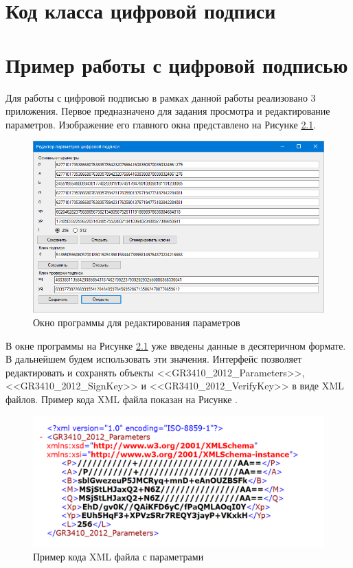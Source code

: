 \chapter{Код класса цифровой подписи}

\chapter{Пример работы с цифровой подписью}
Для работы с цифровой подписью в рамках данной работы реализовано 3 приложения. Первое предназначено для задания просмотра и редактирование параметров. Изображение его главного окна представлено на Рисунке \ref{fig:figG_1}.
\begin{figure}[H]
	\centering
	\includegraphics[width=1.0\linewidth]{inc/img/g1}
	\caption{Окно программы для редактирования параметров}
	\label{fig:figG_1}
\end{figure}
\par
В окне программы на Рисунке \ref{fig:figG_1} уже введены данные в десятеричном формате. В дальнейшем будем использовать эти значения. Интерфейс позволяет редактировать и сохранять объекты <<GR3410\_2012\_Parameters>>, <<GR3410\_2012\_SignKey>> и <<GR3410\_2012\_VerifyKey>> в виде XML файлов. Пример кода XML файла показан на Рисунке .
\begin{figure}[H]
	\centering
	\includegraphics[width=0.9\linewidth]{inc/img/g2}
	\caption{Пример кода XML файла с параметрами}
	\label{fig:figG_2}
\end{figure}
